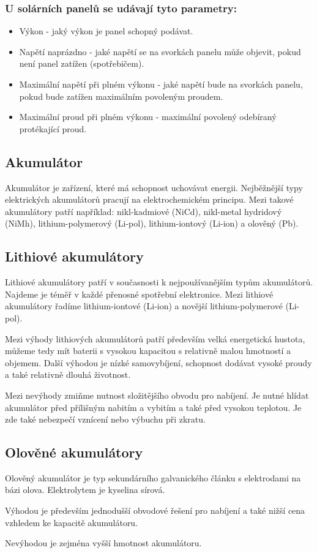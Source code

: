 \subsubsection*{U solárních panelů se udávají tyto parametry:}
\begin{itemize}
\item Výkon - jaký výkon je panel schopný podávat.
\item Napětí naprázdno - jaké napětí se na svorkách panelu může objevit, pokud
není panel zatížen (spotřebičem).
\item Maximální napětí při plném výkonu - jaké napětí bude na svorkách panelu, pokud
bude zatížen maximálním povoleným proudem.
\item Maximální proud při plném výkonu - maximální povolený odebíraný protékající proud.
\end{itemize}

\subsection*{Akumulátor}
Akumulátor je zařízení, které má schopnost uchovávat energii. Nejběžnější typy elektrických akumulátorů pracují na elektrochemickém principu. Mezi takové akumulátory patří například: nikl-kadmiové (NiCd), nikl-metal hydridový (NiMh), lithium-polymerový (Li-pol), lithium-iontový (Li-ion) a olověný (Pb).

\subsection*{Lithiové akumulátory}
Lithiové akumulátory patří v současnosti k nejpoužívanějším typům akumulátorů. Najdeme je téměř v každé přenosné spotřební elektronice. 
Mezi lithiové akumulátory řadíme lithium-iontové (Li-ion) a novější lithium-polymerové (Li-pol).

Mezi výhody lithiových akumulátorů patří především velká energetická hustota, můžeme tedy mít baterii s vysokou kapacitou s relativně malou hmotností a objemem. Další výhodou je nízké samovybíjení, schopnost dodávat vysoké proudy a také relativně dlouhá životnost.

Mezi nevýhody zmiňme nutnost složitějšího obvodu pro nabíjení. Je nutné hlídat akumulátor před přílišným nabitím a vybitím a také před vysokou teplotou. Je zde také nebezpečí vznícení nebo výbuchu při zkratu.

\subsection*{Olověné akumulátory}
Olověný akumulátor je typ sekundárního galvanického článku s elektrodami na bázi olova. Elektrolytem je kyselina sírová.

Výhodou je především jednodušší obvodové řešení pro nabíjení a také nižší cena vzhledem ke kapacitě akumulátoru.

Nevýhodou je zejména vyšší hmotnost akumulátoru.